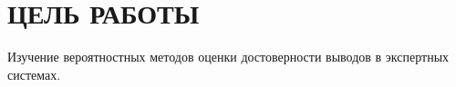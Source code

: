 \section{ЦЕЛЬ РАБОТЫ}

Изучение вероятностных методов оценки достоверности выводов
в экспертных системах.